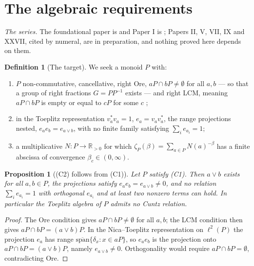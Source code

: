 \documentclass[11pt]{amsart}
\numberwithin{equation}{section}
\newtheorem{proposition}[theorem]{Proposition}
\theoremstyle{definition}
\newtheorem{definition}[theorem]{Definition}
\theoremstyle{remark}
\newcommand{\R}{\mathbb{R}}
\begin{document}
\maketitle

\section{The algebraic requirements}

\emph{The series.} The foundational paper is \cite{Main} and Paper I is \cite{SeriesI};
Papers II, V, VII, IX and XXVII, cited by numeral, are in preparation, and nothing proved
here depends on them.

\begin{definition}[The target]\label{def:target}
We seek a monoid $P$ with:
\begin{enumerate}
\item[(C1)] $P$ non-commutative, cancellative, right Ore, $aP\cap bP\ne\emptyset$ for all
$a,b$ --- so that a group of right fractions $G=PP^{-1}$ exists --- and right LCM, meaning
$aP\cap bP$ is empty or equal to $cP$ for some $c$ \cite{Nica,LacaRaeburn};
\item[(C2)] in the Toeplitz representation $v_a^*v_a=1$, $e_a=v_av_a^*$, the range
projections nested, $e_ae_b=e_{a\vee b}$, with no finite family satisfying
$\sum_ie_{a_i}=1$;
\item[(C3)] a multiplicative $N:P\to\R_{>0}$ for which
$\zeta_P(\beta)=\sum_{a\in P}N(a)^{-\beta}$ has a finite abscissa of convergence
$\beta_c\in(0,\infty)$.
\end{enumerate}
\end{definition}

\begin{proposition}[(C2) follows from (C1)]\label{prop:C2}
Let $P$ satisfy (C1). Then $a\vee b$ exists for all $a,b\in P$, the projections satisfy
$e_ae_b=e_{a\vee b}\ne0$, and no relation $\sum_ie_{a_i}=1$ with orthogonal $e_{a_i}$ and at
least two nonzero terms can hold. In particular the Toeplitz algebra of $P$ admits no Cuntz
relation.
\end{proposition}

\begin{proof}
The Ore condition gives $aP\cap bP\ne\emptyset$ for all $a,b$; the LCM condition then gives
$aP\cap bP=(a\vee b)P$. In the Nica--Toeplitz representation on $\ell^2(P)$ the projection
$e_a$ has range $\overline{\mathrm{span}}\{\delta_x:x\in aP\}$, so $e_ae_b$ is the projection
onto $aP\cap bP=(a\vee b)P$, namely $e_{a\vee b}\ne0$. Orthogonality would require
$aP\cap bP=\emptyset$, contradicting Ore.
\end{proof}
\end{document}
